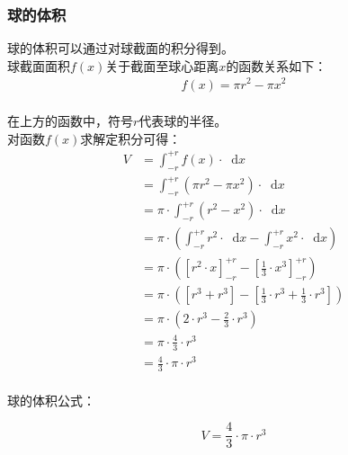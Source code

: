 \documentclass[UTF8]{ctexart}
\newcommand*{\dif}{\mathop{}\!\mathrm{d}}
\begin{document}
\newpage

\subsubsection{球的体积}
    球的体积可以通过对球截面的积分得到。\\[3mm]
    球截面面积$f(x)$关于截面至球心距离$x$的函数关系如下：
    \setcounter{equation}{0}
    \begin{align}
        f(x)=\pi r^2-\pi x^2
    \end{align}\\
    在上方的函数中，符号$r$代表球的半径。\\[8mm]
    对函数$f(x)$求解定积分可得：\vspace{3pt}
    \begin{align}
        V
        &=\int_{-r}^{+r}f(x)\cdot\dif x\\[4mm]
        &=\int_{-r}^{+r}\left(\pi r^2-\pi x^2\right)\cdot\dif x\\[4mm]
        &=\pi\cdot\int_{-r}^{+r}\left(r^2-x^2\right)\cdot\dif x\\[4mm]
        &=\pi\cdot\left(\int_{-r}^{+r}r^2\cdot\dif x-\int_{-r}^{+r}x^2\cdot\dif x\right)\\[4mm]
        &=\pi\cdot\left(\left[r^2\cdot x\right]_{-r}^{+r}-\left[\frac{1}{3}\cdot x^3\right]_{-r}^{+r}\right)\\[4mm]
        &=\pi\cdot\left(\left[r^3+r^3\right]-\left[\frac{1}{3}\cdot r^3+\frac{1}{3}\cdot r^3\right]\right)\\[4mm]
        &=\pi\cdot\left(2\cdot r^3-\frac{2}{3}\cdot r^3\right)\\[4mm]
        &=\pi\cdot\frac{4}{3}\cdot r^3\\[4mm]
        &=\frac{4}{3}\cdot\pi\cdot r^3
    \end{align}\\
    球的体积公式：
    \begin{large}
        \begin{equation*}
            V=\frac{4}{3}\cdot\pi\cdot r^3
        \end{equation*}
    \end{large}

\newpage
\end{document}
